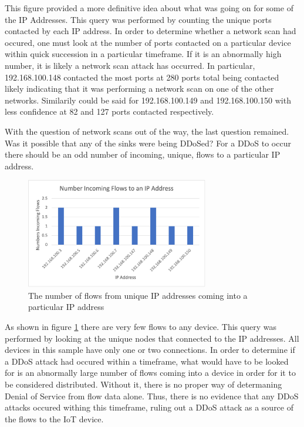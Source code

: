 \documentclass[conference]{IEEEtran}
\begin{document}
This figure provided a more definitive idea about what was going on for some of the IP Addresses. This query
 was performed by counting the unique ports contacted by each IP address. In order
to determine whether a network scan had occured, one must look at the number of ports contacted on a particular
device within quick succession in a particular timeframe. If it is an abnormally high number, it is likely a 
network scan attack has occurred. In particular, 192.168.100.148 contacted the most ports at 280 ports total 
being contacted likely indicating that it was performing a network scan on one of the other networks. 
Similarily could be said for 192.168.100.149 and 192.168.100.150 with less confidence at 82 and 127 ports
contacted respectively.

With the question of network scans out of the way, the last question remained.
Was it possible that any of the sinks were being DDoSed?
For a DDoS to occur there should be an odd number of incoming, unique, flows to a particular IP address. 

\begin{figure}[htbp]
    \includegraphics[width=8cm]{Figure6.png}
    \centering
    \caption{The number of flows from unique IP addresses coming into a particular IP address}
    \label{fig:incomingflows}
\end{figure}

As shown in figure \ref{fig:incomingflows} there are very few flows to any device. This query
was performed by looking at the unique nodes that connected to the IP addresses. All devices in this sample have 
only one or two connections. In order to determine if a DDoS attack had occured within a timeframe, what would have
to be looked for is an abnormally large number of flows coming into a device in order for it to be considered
distributed. Without it, there is no proper way of determaning Denial of Service from flow data alone. 
Thus, there is no evidence that any DDoS attacks occured withing this timeframe, ruling out a DDoS attack as a source 
of the flows to the IoT device. 
\end{document}
